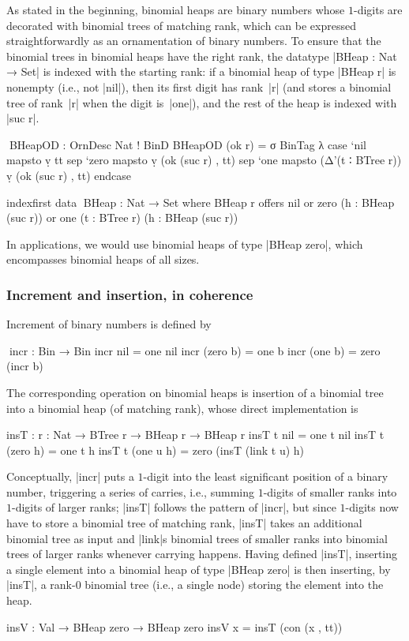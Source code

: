 As stated in the beginning, binomial heaps are binary numbers whose $1$-digits are decorated with binomial trees of matching rank, which can be expressed straightforwardly as an ornamentation of binary numbers.
To ensure that the binomial trees in binomial heaps have the right rank, the datatype |BHeap : Nat → Set| is indexed with the starting rank: if a binomial heap of type |BHeap r| is nonempty (i.e., not |nil|), then its first digit has rank~|r| (and stores a binomial tree of rank~|r| when the digit is~|one|), and the rest of the heap is indexed with |suc r|.
\begin{code}
^^^BHeapOD : OrnDesc Nat ! BinD
BHeapOD (ok r) = σ BinTag λ  case  `nil   mapsto  ṿ tt
                             sep   `zero  mapsto  ṿ (ok (suc r) , tt)
                             sep   `one   mapsto  (Δ'(t ∶ BTree r)) ṿ (ok (suc r) , tt) endcase

indexfirst data ^^^BHeap : Nat → Set where
  BHeap r  offers  nil
           or      zero  (h : BHeap (suc r))
           or      one   (t : BTree r) (h : BHeap (suc r))
\end{code}
In applications, we would use binomial heaps of type |BHeap zero|, which encompasses binomial heaps of all sizes.

\subsubsection{Increment and insertion, in coherence}
Increment of binary numbers is defined by
\begin{code}
^^^incr : Bin → Bin
incr nil        =  one nil
incr (zero  b)  =  one b
incr (one   b)  =  zero (incr b)
\end{code}
The corresponding operation on binomial heaps is insertion of a binomial tree into a binomial heap (of matching rank), whose direct implementation is
\begin{code}
insT : {r : Nat} → BTree r → BHeap r → BHeap r
insT t nil         = one t nil
insT t (zero   h)  = one t h
insT t (one u  h)  = zero (insT (link t u) h)
\end{code}
Conceptually, |incr| puts a $1$-digit into the least significant position of a binary number, triggering a series of carries, i.e., summing $1$-digits of smaller ranks into $1$-digits of larger ranks; |insT| follows the pattern of |incr|, but since $1$-digits now have to store a binomial tree of matching rank, |insT| takes an additional binomial tree as input and |link|s binomial trees of smaller ranks into binomial trees of larger ranks whenever carrying happens.
Having defined |insT|, inserting a single element into a binomial heap of type |BHeap zero| is then inserting, by |insT|, a rank-$0$ binomial tree (i.e., a single node) storing the element into the heap.
\begin{code}
insV : Val → BHeap zero → BHeap zero
insV x = insT (con (x , tt))
\end{code}

